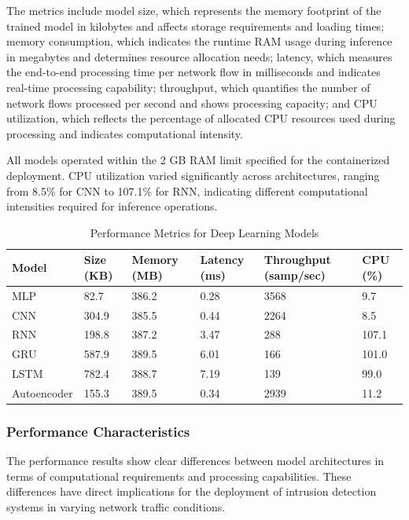 \documentclass[journal,article,submit,moreauthors,pdftex]{Definitions/tsp}
\begin{document}
The metrics include model size, which represents the memory footprint of the trained model in kilobytes and affects storage requirements and loading times; memory consumption, which indicates the runtime RAM usage during inference in megabytes and determines resource allocation needs; latency, which measures the end-to-end processing time per network flow in milliseconds and indicates real-time processing capability; throughput, which quantifies the number of network flows processed per second and shows processing capacity; and CPU utilization, which reflects the percentage of allocated CPU resources used during processing and indicates computational intensity.

All models operated within the 2 GB RAM limit specified for the containerized deployment. CPU utilization varied significantly across architectures, ranging from 8.5\% for CNN to 107.1\% for RNN, indicating different computational intensities required for inference operations.

\begin{table}[H]
\caption{Performance Metrics for Deep Learning Models}
\label{tab:performance_metrics}
\begin{tabularx}{\textwidth}{XXXXXX}
\toprule
Model & Size (KB) & Memory (MB) & Latency (ms) & Throughput (samp/sec) & CPU (\%) \\
\midrule
MLP & 82.7 & 386.2 & 0.28 & 3568 & 9.7 \\
CNN & 304.9 & 385.5 & 0.44 & 2264 & 8.5 \\
RNN & 198.8 & 387.2 & 3.47 & 288 & 107.1 \\
GRU & 587.9 & 389.5 & 6.01 & 166 & 101.0 \\
LSTM & 782.4 & 388.7 & 7.19 & 139 & 99.0 \\
Autoencoder & 155.3 & 389.5 & 0.34 & 2939 & 11.2 \\
\bottomrule
\end{tabularx}
\end{table}

\subsubsection{Performance Characteristics}

The performance results show clear differences between model architectures in terms of computational requirements and processing capabilities. These differences have direct implications for the deployment of intrusion detection systems in varying network traffic conditions.
\end{document}
